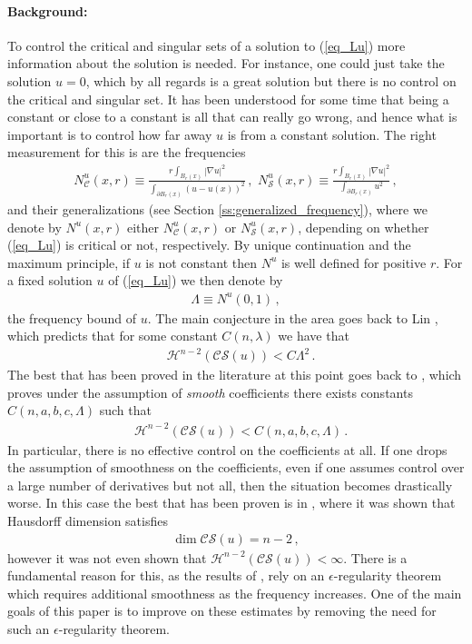 \documentclass[11pt]{article}
\begin{document}
\paragraph{Background:}  To control the critical and singular sets of a solution to (\ref{eq_Lu}) more information about the solution is needed.  For instance, one could just take the solution $u=0$, which by all regards is a great solution but there is no control on the critical and singular set.  It has been understood for some time that being a constant or close to a constant is all that can really go wrong, and hence what is important is to control how far away $u$ is from a constant solution.  The right measurement for this is are the frequencies
\begin{align}\label{d:frequency}
N^u_{\mathcal{C}}(x,r)\equiv \frac{r\int_{B_r(x)} |\nabla u|^2}{\int_{\partial B_r(x)} (u-u(x))^2}\, ,\,\, N^u_{\mathcal{S}}(x,r)\equiv \frac{r \int_{B_r(x)} |\nabla u|^2}{\int_{\partial B_r(x)} u^2}\, ,
\end{align}
and their generalizations (see Section \ref{ss:generalized_frequency}), where we denote by $N^u(x,r)$ either $N^u_{\mathcal{C}}(x,r)$ or $N^u_{\mathcal{S}}(x,r)$, depending on whether (\ref{eq_Lu}) is critical or not, respectively.  By unique continuation and the maximum principle, if $u$ is not constant then $N^u$ is well defined for positive $r$.  For a fixed solution $u$ of (\ref{eq_Lu}) we then denote by
\begin{align}
\Lambda \equiv N^u(0,1)\, ,
\end{align}
the frequency bound of $u$.  The main conjecture in the area goes back to Lin \cite{lin}, which predicts that for some constant $C(n,\lambda)$ we have that
\begin{align}
&{\mathcal{H}}^{n-2}({\mathcal{CS}}(u))< C\Lambda^2\, .
\end{align}
The best that has been proved in the literature at this point goes back to \cite{hanlin,hanhardtlin,HLrank}, which proves under the assumption of {\it smooth} coefficients there exists constants $C(n,a,b,c,\Lambda)$ such that
\begin{align}
&{\mathcal{H}}^{n-2}({\mathcal{CS}}(u))< C(n,a,b,c,\Lambda)\, .
\end{align}
In particular, there is no effective control on the coefficients at all.  If one drops the assumption of smoothness on the coefficients, even if one assumes control over a large number of derivatives but not all, then the situation becomes drastically worse.  In this case the best that has been proven is in \cite{hanlin,han_sing}, where it was shown that Hausdorff dimension satisfies
\begin{align}
\dim{\mathcal{CS}}(u) = n-2\, ,
\end{align}
however it was not even shown that ${\mathcal{H}}^{n-2}({\mathcal{CS}}(u))<\infty$.  There is a fundamental reason for this, as the results of \cite{hanlin},\cite{lin} rely on an $\epsilon$-regularity theorem which requires additional smoothness as the frequency increases.  One of the main goals of this paper is to improve on these estimates by removing the need for such an $\epsilon$-regularity theorem.
\end{document}
